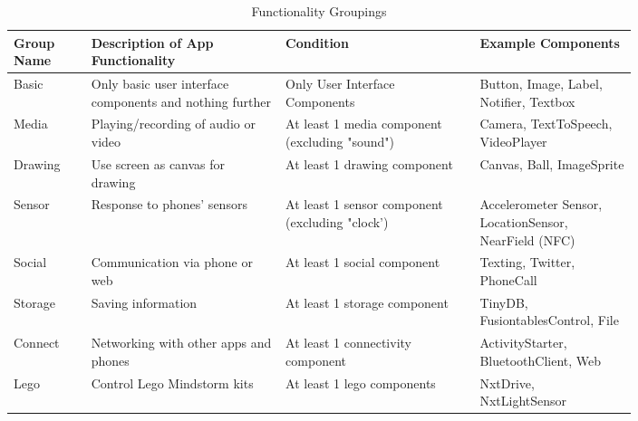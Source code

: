 \documentclass[conference]{IEEEtran}
\begin{document}
\begin{table}[h!]
\renewcommand{\arraystretch}{1.3}
\caption{Functionality Groupings}
\label{table_groups}
\centering
\begin{tabular}{| p{0.1\linewidth} | p{0.25\linewidth} | p{0.25\linewidth} | p{0.2\linewidth} | }
\hline

Group Name &  Description of App Functionality & Condition & Example Components\\
\hline
\hline
Basic & Only basic user interface components and nothing further &Only User Interface Components & Button, Image, Label, Notifier, Textbox \\
\hline

Media & Playing/recording of audio or video & At least 1 media component (excluding "sound") &Camera, TextToSpeech, VideoPlayer \\
\hline

Drawing
&Use screen as canvas for drawing
&At least 1 drawing component
&Canvas, Ball, ImageSprite\\
\hline

Sensor
&Response to phones' sensors
&At least 1 sensor component (excluding "clock')
&Accelerometer Sensor, LocationSensor, NearField (NFC)\\
\hline


Social
&Communication via phone or web
&At least 1 social component
&Texting, Twitter, PhoneCall\\
\hline

Storage
&Saving information
&At least 1 storage component
&TinyDB, FusiontablesControl, File\\
\hline

Connect
&Networking with other apps and phones
&At least 1 connectivity component
&ActivityStarter, BluetoothClient, Web\\

\hline
Lego
&Control Lego Mindstorm kits
&At least 1 lego components
&NxtDrive, NxtLightSensor\\
\hline

\end{tabular}
\end{table}
\end{document}
